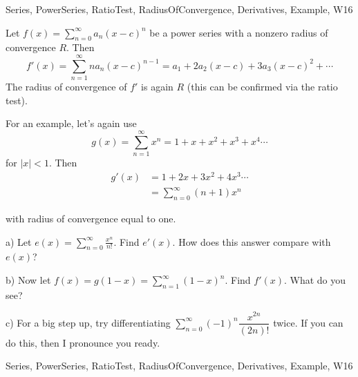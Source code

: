  

\begin{tagblock}{Series, PowerSeries, RatioTest, RadiusOfConvergence, Derivatives, Example, W16}
\begin{question}

Let $\displaystyle f(x)=\sum_{n=0}^{\infty} a_n(x-c)^n$ be a power series with a nonzero radius of convergence $R$. Then 
\[
f'(x)=\sum_{n=1}^{\infty}na_n(x-c)^{n-1}=a_1+2a_2(x-c)+3a_3(x-c)^2+\cdots
\]
The radius of convergence of $f'$ is again $R$ (this can be confirmed via the ratio test).

\bigskip

For an example, let's again use
\[
g(x)=\sum_{n=1}^{\infty}x^n=1+x+x^2+x^3+x^4\cdots
\]
for $|x|<1$.
Then
\begin{align*}
g'(x)&=1+2x+3x^2+4x^3\cdots\\
&=\sum_{n=0}^{\infty}(n+1)x^n
\end{align*}

with radius of convergence equal to one. 

\bigskip

a) Let $e(x)=\displaystyle\sum_{n=0}^{\infty}\frac{x^n}{n!}$. Find $e'(x)$. How does this answer compare with $e(x)$?

\bigskip

b) Now let $f(x)=g(1-x)=\displaystyle\sum_{n=1}^{\infty}(1-x)^n$. Find $f'(x)$. What do you see? 

\bigskip

c) For a big step up, try differentiating $\displaystyle\sum_{n=0}^{\infty}(-1)^n\dfrac {x^{2n}}{(2n)!}$ twice. If you can do this, then I pronounce you ready.
	
	
\begin{tags}
	    Series, PowerSeries, RatioTest, RadiusOfConvergence, Derivatives, Example, W16
\end{tags}
	
\begin{diary}
	    
\end{diary}
	
\begin{solution}
	   
\end{solution}
	
\end{question}

\end{tagblock}


